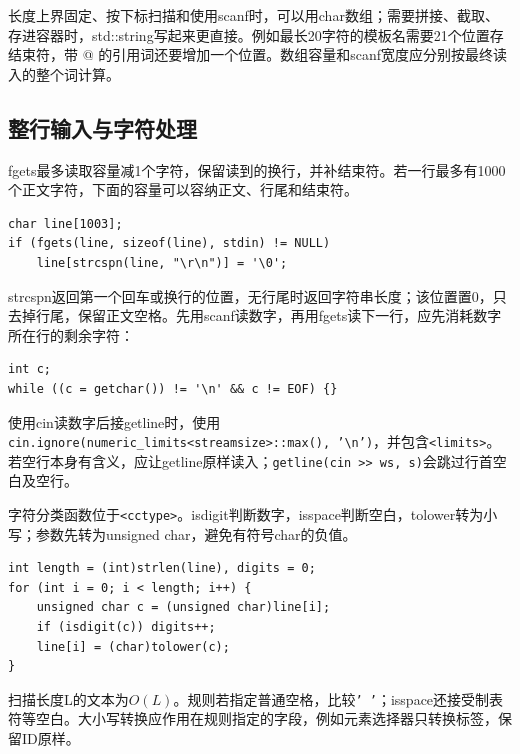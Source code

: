 长度上界固定、按下标扫描和使用scanf时，可以用char数组；需要拼接、截取、存进容器时，std::string写起来更直接。例如最长20字符的模板名需要21个位置存结束符，带 @ 的引用词还要增加一个位置。数组容量和scanf宽度应分别按最终读入的整个词计算。

\subsection{整行输入与字符处理}
fgets最多读取容量减1个字符，保留读到的换行，并补结束符。若一行最多有1000个正文字符，下面的容量可以容纳正文、行尾和结束符。
\begin{lstlisting}
char line[1003];
if (fgets(line, sizeof(line), stdin) != NULL)
    line[strcspn(line, "\r\n")] = '\0';
\end{lstlisting}
strcspn返回第一个回车或换行的位置，无行尾时返回字符串长度；该位置置0，只去掉行尾，保留正文空格。先用scanf读数字，再用fgets读下一行，应先消耗数字所在行的剩余字符：
\begin{lstlisting}
int c;
while ((c = getchar()) != '\n' && c != EOF) {}
\end{lstlisting}
使用cin读数字后接getline时，使用\texttt{cin.ignore(numeric\_limits<streamsize>::max(), '\textbackslash n')}，并包含\texttt{<limits>}。若空行本身有含义，应让getline原样读入；\texttt{getline(cin >> ws, s)}会跳过行首空白及空行。

字符分类函数位于\texttt{<cctype>}。isdigit判断数字，isspace判断空白，tolower转为小写；参数先转为unsigned char，避免有符号char的负值。
\begin{lstlisting}
int length = (int)strlen(line), digits = 0;
for (int i = 0; i < length; i++) {
    unsigned char c = (unsigned char)line[i];
    if (isdigit(c)) digits++;
    line[i] = (char)tolower(c);
}
\end{lstlisting}
扫描长度L的文本为$O(L)$。规则若指定普通空格，比较\texttt{' '}；isspace还接受制表符等空白。大小写转换应作用在规则指定的字段，例如元素选择器只转换标签，保留ID原样。

